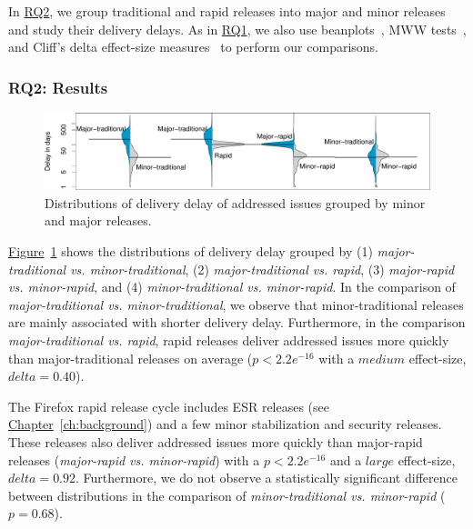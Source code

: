 In \hyperref[ch5:rq2]{RQ2}, we group traditional and rapid releases into major
and minor releases and study their delivery delays. As in
\hyperref[ch5:rq1]{RQ1}, we also use beanplots~\cite{kampstra2008beanplot}, MWW
tests~\cite{wilks2011statistical}, and Cliff's delta effect-size
measures~\cite{cliff1993dominance} to perform our comparisons.

\subsubsection*{RQ2: Results}

\begin{figure}[t!]
	\centering
	\includegraphics[width=\textwidth,keepaspectratio]
	{chapters/chapter5/figures/rq2/major_vs_minor.pdf}
	\caption{
		Distributions of delivery delay of addressed issues grouped by minor and major
		releases.
	}
	\label{fig:major_vs_minor}
\end{figure}

\begin{sloppypar}
\noindent\DIFdelbegin \textit{\textbf{}%
}%
\DIFdelend \DIFaddbegin {}
\DIFaddend \hyperref[fig:major_vs_minor]{Figure}~\ref{fig:major_vs_minor} shows the distributions of delivery delay
grouped by (1) \textit{major-traditional vs. minor-traditional}, (2)
\textit{major-traditional vs. rapid}, (3) \textit{major-rapid vs. minor-rapid},
and (4) \textit{minor-traditional vs. minor-rapid}. In the comparison of
\textit{major-traditional vs.  minor-traditional}, we observe that
minor-traditional releases are mainly associated with shorter delivery delay.
Furthermore, in the comparison \textit{major-traditional vs. rapid}, rapid
releases deliver addressed issues more quickly than major-traditional releases
on average ($p<2.2e^{-16}$ with a $medium$ effect-size, \ie  $delta=0.40$). 
\end{sloppypar}

The Firefox rapid release cycle includes ESR releases (see
\hyperref[ch:background]{Chapter}~\ref{ch:background}) and a few minor
stabilization and security releases. These releases also deliver addressed
issues more quickly than major-rapid releases (\textit{major-rapid vs.
minor-rapid}) with a $p<2.2e^{-16}$ and a $large$ effect-size, \ie $delta=0.92$.
Furthermore, we do not observe a statistically significant difference between
distributions in the comparison of \textit{minor-traditional vs. minor-rapid}
($p=0.68$).

